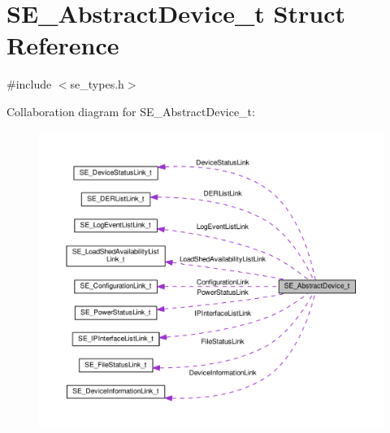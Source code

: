 \hypertarget{structSE__AbstractDevice__t}{}\section{S\+E\+\_\+\+Abstract\+Device\+\_\+t Struct Reference}
\label{structSE__AbstractDevice__t}


{\ttfamily \#include $<$se\+\_\+types.\+h$>$}



Collaboration diagram for S\+E\+\_\+\+Abstract\+Device\+\_\+t\+:\nopagebreak
\begin{figure}[H]
\begin{center}
\leavevmode
\includegraphics[width=350pt]{structSE__AbstractDevice__t__coll__graph}
\end{center}
\end{figure}
